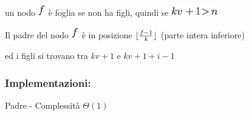 \documentclass{article}
\DeclarePairedDelimiter\floor{\lfloor}{\rfloor}
\begin{document}
{}

{un nodo }\includegraphics{images/image112.png}{~è foglia se non ha
figli, quindi se }\includegraphics{images/image113.png}

{}

{Il padre del nodo }\includegraphics{images/image112.png}{~è in
posizione $\floor{\frac{f-1}{k}}$ (parte intera
inferiore) }{ed i figli si trovano tra $kv+1$ e $kv+1+i-1$

{}

\hypertarget{h.6c4aui6rl05k}{\subsubsection{\texorpdfstring{{Implementazioni:}}{Implementazioni:}}\label{h.6c4aui6rl05k}}

{}

{Padre - }{Complessità $\Theta(1)$}

\protect\hypertarget{t.985fc1f36a4403829b157356928a51ed5f0644e7}{}{}\protect\hypertarget{t.7}{}{}

}
\end{document}

